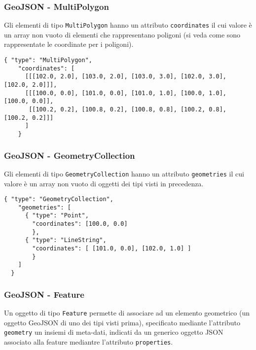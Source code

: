\documentclass[8pt]{beamer}
\begin{document}
\begin{frame}[fragile]
 \frametitle{GeoJSON - MultiPolygon}
 Gli elementi di tipo \texttt{MultiPolygon} hanno un attributo \texttt{coordinates} 
 il cui valore \`e un array non vuoto di elementi che rappresentano poligoni (si veda 
 come sono rappresentate le coordinate per i poligoni).
\begin{verbatim}
{ "type": "MultiPolygon",
    "coordinates": [
      [[[102.0, 2.0], [103.0, 2.0], [103.0, 3.0], [102.0, 3.0], [102.0, 2.0]]],
      [[[100.0, 0.0], [101.0, 0.0], [101.0, 1.0], [100.0, 1.0], [100.0, 0.0]],
       [[100.2, 0.2], [100.8, 0.2], [100.8, 0.8], [100.2, 0.8], [100.2, 0.2]]]
      ]
    }
\end{verbatim}
\end{frame}

\begin{frame}[fragile]
 \frametitle{GeoJSON - GeometryCollection}
 Gli elementi di tipo \texttt{GeometryCollection} hanno un attributo \texttt{geometries} 
 il cui valore \`e un array non vuoto di oggetti dei tipi visti in precedenza.
\begin{verbatim}
{ "type": "GeometryCollection",
    "geometries": [
      { "type": "Point",
        "coordinates": [100.0, 0.0]
        },
      { "type": "LineString",
        "coordinates": [ [101.0, 0.0], [102.0, 1.0] ]
        }
    ]
  }
\end{verbatim}
\end{frame}

\begin{frame}
 \frametitle{GeoJSON - Feature}
 Un oggetto di tipo \texttt{Feature} permette di associare ad un elemento
 geometrico (un oggetto GeoJSON di uno dei tipi visti prima), specificato
 mediante l'attributo \texttt{geometry} un insiemi di meta-dati, indicati 
 da un generico oggetto JSON associato alla feature mediantre l'attributo 
 \texttt{properties}.
 \vspace{\baselineskip}

\end{frame}
\end{document}
